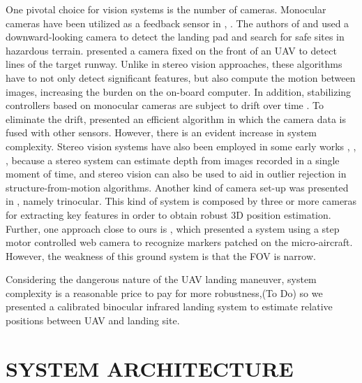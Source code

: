 \documentclass[letterpaper, 10 pt, conference]{ieeeconf}  %
\begin{document}
One pivotal choice for vision systems is the number of cameras. Monocular cameras have been utilized as a feedback sensor in \cite{Shakernia1999}, \cite{538972}. The authors of \cite{Zhao2012} and \cite{Johnson2005} used a downward-looking camera to detect the landing pad and search for safe sites in hazardous terrain. \cite{Bourquardez2007} presented a camera fixed on the front of an UAV to detect lines of the target runway. Unlike in stereo vision approaches, these algorithms have to not only detect significant features, but also compute the motion between images, increasing the burden on the on-board computer. In addition, stabilizing controllers based on monocular cameras are subject to drift over time \cite{Zingg2010}. To eliminate the drift,  \cite{engel2012camera} presented an efficient algorithm in which the camera data is fused with other sensors. However, there is an evident increase in system complexity. Stereo vision systems have also been employed in some early works \cite{
Saripalli2003a}, \cite{1331783}, \cite{Altug2005}, because a stereo system can estimate depth from images recorded
in a single moment of time, and stereo vision can also be used to aid in outlier rejection in structure-from-motion algorithms. Another kind of camera set-up was presented in \cite{Martinez2009}, namely trinocular. This kind of system is composed by three or more cameras for extracting key features in order to obtain robust 3D position estimation. Further, one approach close to ours is  \cite{Wang2006}, which presented a system using a step motor controlled web camera to recognize markers patched on the micro-aircraft. However, the weakness of this ground system is that the FOV is narrow. 

Considering the dangerous nature of the UAV landing maneuver, system complexity is a reasonable price to pay for more robustness,(To Do) so we presented a calibrated binocular infrared landing system to estimate relative positions between UAV and landing site.


\section{SYSTEM ARCHITECTURE}
\end{document}
